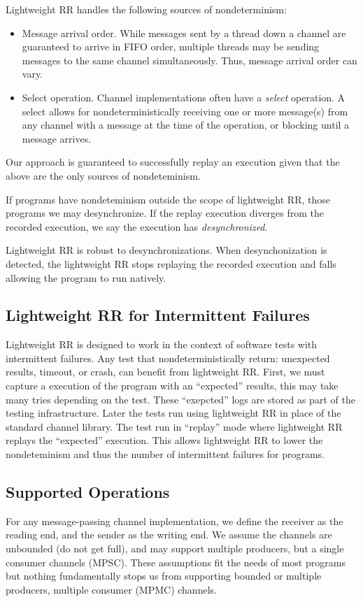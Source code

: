 \documentclass{article}
\begin{document}
Lightweight RR handles the following sources of nondeterminism:
\begin{itemize}
\item Message arrival order. While messages sent by a thread down a channel are guaranteed to arrive in FIFO order, multiple threads may be sending messages to the same channel simultaneously. Thus, message arrival order can vary.
\item Select operation. Channel implementations often have a \textit{select} operation. A select allows for nondeterministically receiving one or more message(s) from any channel with a message at the time of the operation, or blocking until a message arrives.
\end{itemize}

Our approach is guaranteed to successfully replay an execution given that the above are the only sources of nondeteminism.

If programs have nondeteminism outside the scope of lightweight RR, those programs we may desynchronize. If the replay execution diverges from the recorded execution, we say the execution has \textit{desynchronized}.

Lightweight RR is robust to desynchronizations. When desynchonization is detected, the lightweight RR stops replaying the recorded execution and falls allowing the program to run natively.

\subsection{Lightweight RR for Intermittent Failures}
Lightweight RR is designed to work in the context of software tests with intermittent
failures.
Any test that nondeterministically return: unexpected results, timeout, or crash, can
benefit from lightweight RR. First, we must capture a execution of the program with an
``expected'' results, this may take many tries depending on the test.
These ``exepcted'' logs are stored as part of the testing infrastructure. Later the
tests run using lightweight RR in place of the standard channel library. The test run
in ``replay'' mode where lightweight RR replays the ``expected'' execution. This allows
lightweight RR to lower the nondeteminism and thus the number of intermittent failures
for programs.

\subsection{Supported Operations}
For any message-passing channel implementation, we define the receiver as the reading end, and the sender as the writing end. We assume the channels are unbounded (do not get full), and may support multiple producers, but a single consumer channels (MPSC). These assumptions fit the needs of most programs but nothing fundamentally stops us from supporting bounded or multiple producers, multiple consumer (MPMC) channels.
\end{document}
